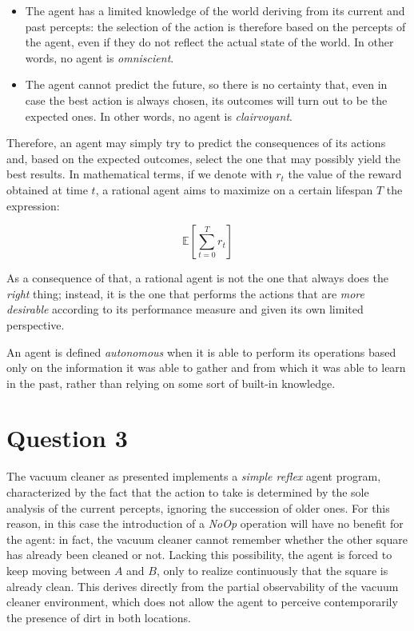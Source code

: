 \documentclass[letterpaper,headings=standardclasses]{scrartcl}
\begin{document}
\begin{itemize}

\item The agent has a limited knowledge of the world deriving from its current and past percepts: the selection of the action is therefore based on the percepts of the agent, even if they do not reflect the actual state of the world. In other words, no agent is \emph{omniscient}.
\item The agent cannot predict the future, so there is no certainty that, even in case the best action is always chosen, its outcomes will turn out to be the expected ones. In other words, no agent is \emph{clairvoyant}. 
 
\end{itemize}

Therefore, an agent may simply try to predict the consequences of its actions and, based on the expected outcomes, select the one that may possibly yield the best results. In mathematical terms, if we denote with $r_t$ the value of the reward obtained at time $t$, a rational agent aims to maximize on a certain lifespan $T$ the expression:

$$ \mathbb{E} \left[ \sum_{t=0}^{T} r_t \right] $$

As a consequence of that, a rational agent is not the one that always does the \emph{right} thing; instead, it is the one that performs the actions that are \emph{more desirable} according to its performance measure and given its own limited perspective.

An agent is defined \emph{autonomous} when it is able to perform its operations based only on the information it was able to gather and from which it was able to learn in the past, rather than relying on some sort of built-in knowledge.

\section{Question 3}

The vacuum cleaner as presented implements a \emph{simple reflex} agent program, characterized by the fact that the action to take is determined by the sole analysis of the current percepts, ignoring the succession of older ones. For this reason, in this case the introduction of a \emph{NoOp} operation will have no benefit for the agent: in fact, the vacuum cleaner cannot remember whether the other square has already been cleaned or not. Lacking this possibility, the agent is forced to keep moving between $A$ and $B$, only to realize continuously that the square is already clean. This derives directly from the partial observability of the vacuum cleaner environment, which does not allow the agent to perceive contemporarily the presence of dirt in both locations.
\end{document}
